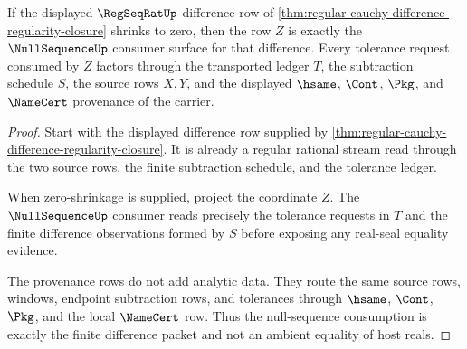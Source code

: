 \begin{theorem}
\label{thm:regular-cauchy-difference-nullsequence-consumption}
If the displayed $\RegSeqRatUp$ difference row of \autoref{thm:regular-cauchy-difference-regularity-closure} shrinks to zero, then the row $Z$ is exactly the $\NullSequenceUp$ consumer surface for that difference. Every tolerance request consumed by $Z$ factors through the transported ledger $T$, the subtraction schedule $S$, the source rows $X,Y$, and the displayed $\hsame$, $\Cont$, $\Pkg$, and $\NameCert$ provenance of the carrier.
\end{theorem}
\begin{proof}
Start with the displayed difference row supplied by \autoref{thm:regular-cauchy-difference-regularity-closure}. It is already a regular rational stream read through the two source rows, the finite subtraction schedule, and the tolerance ledger.

When zero-shrinkage is supplied, project the coordinate $Z$. The $\NullSequenceUp$ consumer reads precisely the tolerance requests in $T$ and the finite difference observations formed by $S$ before exposing any real-seal equality evidence.

The provenance rows do not add analytic data. They route the same source rows, windows, endpoint subtraction rows, and tolerances through $\hsame$, $\Cont$, $\Pkg$, and the local $\NameCert$ row. Thus the null-sequence consumption is exactly the finite difference packet and not an ambient equality of host reals.
\end{proof}

